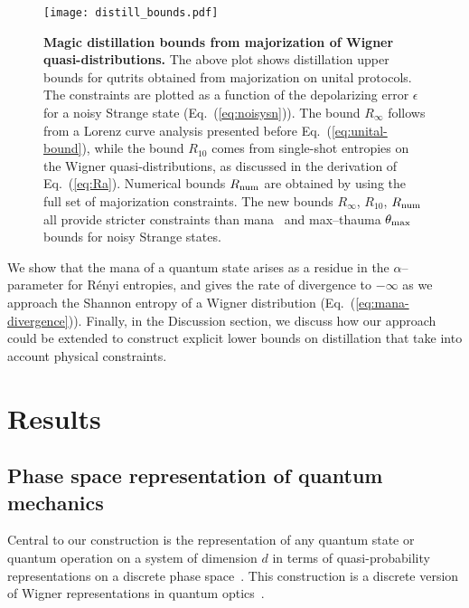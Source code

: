 \documentclass[
onecolumn,
superscriptaddress
]{revtex4-1}
\newcommand{\revhigh}[1]{{\color{red}#1}}
\begin{document}
\begin{figure}[t]
    \centering
    \texttt{[image: distill\_bounds.pdf]}
    \caption{\textbf{Magic distillation bounds from majorization of Wigner quasi-distributions.} The above plot shows distillation upper bounds for qutrits obtained from majorization on unital protocols. The constraints are plotted as a function of the depolarizing error $\epsilon$ for a noisy Strange state (Eq.~(\ref{eq:noisysn})). \revhigh{The bound $R_\infty$ follows from a Lorenz curve analysis presented before Eq.~(\ref{eq:unital-bound}), while the bound $R_{10}$ comes from single-shot entropies on the Wigner quasi-distributions, as discussed in the derivation of Eq.~(\ref{eq:Ra})}. Numerical bounds $R_{\rm{num}}$ are obtained by using the full set of majorization constraints. The new bounds $R_\infty$, $R_{10}$, $R_{\rm{num}}$ all provide stricter constraints than mana~\cite{cit:veitch2} and max--thauma $\theta_{\rm{max}}$~\cite{Wang_2020} bounds for noisy Strange states.
    }
    \label{fig:distill_bounds}
\end{figure}


We show that the mana of a quantum state arises as a residue in the $\alpha$--parameter for R\'{e}nyi entropies, and gives the rate of divergence to $-\infty$ as we approach the Shannon entropy of a Wigner distribution (Eq.~(\ref{eq:mana-divergence})).
Finally, in the Discussion section, we discuss how our approach could be extended to construct explicit lower bounds on distillation that take into account physical constraints.

\section*{Results}

\revhigh{
\subsection*{Phase space representation of quantum mechanics}
}

Central to our construction is the representation of any quantum state or quantum operation on a system of dimension $d$ in terms of quasi-probability representations on a discrete phase space~\cite{Gross2006, Ferrie_2008}. This construction is a discrete version of Wigner representations in quantum optics~\cite{Wigner_1932, Vourdas_2004, Kenfack_2004}.
\end{document}
